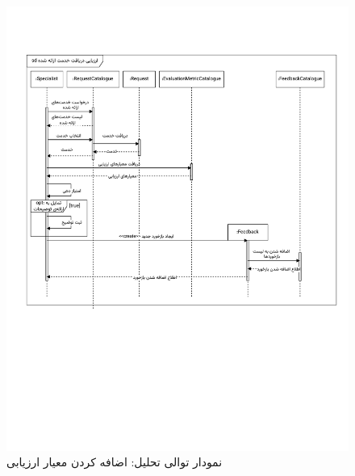 \begin{figure}[ht!]
	\centering
	\includegraphics[scale=0.8, page=3]{figs/OOD-Sequence-3.pdf}
	\caption{نمودار توالی تحلیل: اضافه کردن معیار ارزیابی}
\end{figure}
\FloatBarrier
\newpage

